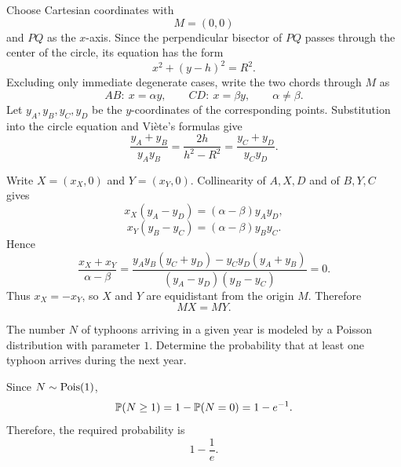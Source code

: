     \begin{solution}
        Choose Cartesian coordinates with
        \[
            M=(0,0)
        \]
        and $PQ$ as the $x$-axis. Since the perpendicular bisector of $PQ$
        passes through the center of the circle, its equation has the form
        \[
            x^2+(y-h)^2=R^2.
        \]
        Excluding only immediate degenerate cases, write the two chords through
        $M$ as
        \[
            AB:\ x=\alpha y,
            \qquad
            CD:\ x=\beta y,
            \qquad
            \alpha\neq\beta.
        \]
        Let $y_A,y_B,y_C,y_D$ be the $y$-coordinates of the corresponding
        points. Substitution into the circle equation and Vi\`ete's formulas
        give
        \[
            \frac{y_A+y_B}{y_Ay_B}
            =
            \frac{2h}{h^2-R^2}
            =
            \frac{y_C+y_D}{y_Cy_D}.
        \]

        Write $X=(x_X,0)$ and $Y=(x_Y,0)$. Collinearity of $A,X,D$ and of
        $B,Y,C$ gives
        \[
            x_X(y_A-y_D)
            =
            (\alpha-\beta)y_Ay_D,
        \]
        \[
            x_Y(y_B-y_C)
            =
            (\alpha-\beta)y_By_C.
        \]
        Hence
        \[
            \frac{x_X+x_Y}{\alpha-\beta}
            =
            \frac{
                y_Ay_B(y_C+y_D)-y_Cy_D(y_A+y_B)
            }{
                (y_A-y_D)(y_B-y_C)
            }
            =0.
        \]
        Thus $x_X=-x_Y$, so $X$ and $Y$ are equidistant from the origin $M$.
        Therefore
        \[
            \boxed{MX=MY}.
        \]
    \end{solution}

    \begin{expectedproblem}
        The number $N$ of typhoons arriving in a given year is modeled by a
        Poisson distribution with parameter $1$. Determine the probability that
        at least one typhoon arrives during the next year.
    \end{expectedproblem}

    \begin{solution}
        Since $N\sim\operatorname{Pois}(1)$,
        \[
            \mathbb{P}(N\geq1)
            =
            1-\mathbb{P}(N=0)
            =
            1-e^{-1}.
        \]
        Therefore, the required probability is
        \[
            \boxed{1-\frac{1}{e}}.
        \]
    \end{solution}

